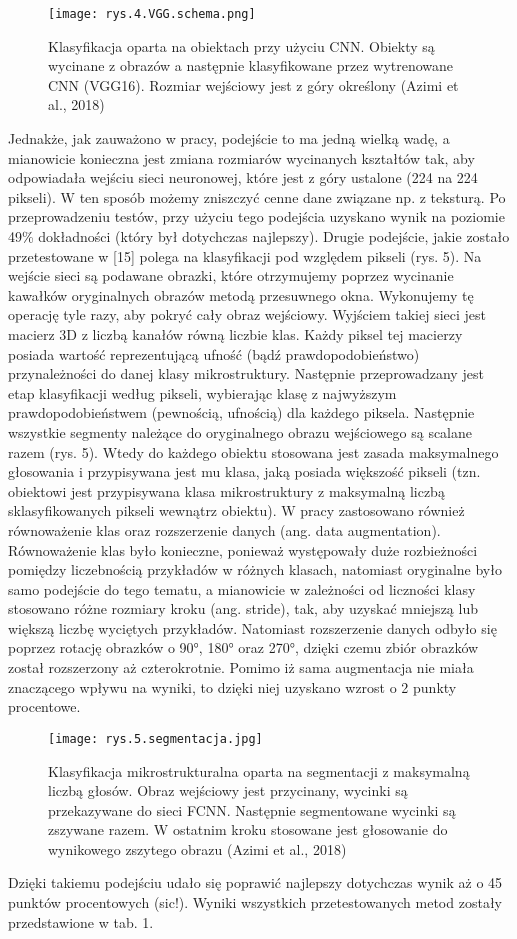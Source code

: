 \begin{figure}[h]
    \centering
    \texttt{[image: rys.4.VGG.schema.png]}
    \caption{Klasyfikacja oparta na obiektach przy użyciu CNN. Obiekty są wycinane z obrazów a następnie klasyfikowane przez wytrenowane CNN (VGG16). Rozmiar wejściowy jest z góry określony (Azimi et al., 2018)}
    \label{fig:mesh4}
\end{figure}

\noindent Jednakże, jak zauważono w pracy, podejście to ma jedną wielką wadę, a mianowicie konieczna jest zmiana rozmiarów wycinanych kształtów tak, aby odpowiadała wejściu sieci neuronowej, które jest z góry ustalone (224 na 224 pikseli). W ten sposób możemy zniszczyć cenne dane związane np. z teksturą. Po przeprowadzeniu testów, przy użyciu tego podejścia uzyskano wynik na poziomie 49\% dokładności (który był dotychczas najlepszy). Drugie podejście, jakie zostało przetestowane w [15] polega na klasyfikacji pod względem pikseli (rys. 5). Na wejście sieci są podawane obrazki, które otrzymujemy poprzez wycinanie kawałków oryginalnych obrazów metodą przesuwnego okna. Wykonujemy tę operację tyle razy, aby pokryć cały obraz wejściowy. Wyjściem takiej sieci jest macierz 3D z liczbą kanałów równą liczbie klas. Każdy piksel tej macierzy posiada wartość reprezentującą ufność (bądź prawdopodobieństwo) przynależności do danej klasy mikrostruktury. Następnie przeprowadzany jest etap klasyfikacji według pikseli, wybierając klasę z najwyższym prawdopodobieństwem (pewnością, ufnością) dla każdego piksela. Następnie wszystkie segmenty należące do oryginalnego obrazu wejściowego są scalane razem (rys. 5). Wtedy do każdego obiektu stosowana jest zasada maksymalnego głosowania i przypisywana jest mu klasa, jaką posiada większość pikseli (tzn. obiektowi jest przypisywana klasa mikrostruktury z maksymalną liczbą sklasyfikowanych pikseli wewnątrz obiektu). W pracy zastosowano również równoważenie klas oraz rozszerzenie danych (ang. data augmentation). Równoważenie klas było konieczne, ponieważ występowały duże rozbieżności pomiędzy liczebnością przykładów w różnych klasach, natomiast oryginalne było samo podejście do tego tematu, a mianowicie w zależności od liczności klasy stosowano różne rozmiary kroku (ang. stride), tak, aby uzyskać mniejszą lub większą liczbę wyciętych przykładów. Natomiast rozszerzenie danych odbyło się poprzez rotację obrazków o 90°, 180° oraz 270°, dzięki czemu zbiór obrazków został rozszerzony aż czterokrotnie. Pomimo iż sama augmentacja nie miała znaczącego wpływu na wyniki, to dzięki niej uzyskano wzrost o 2 punkty procentowe.
\begin{figure}[h]
    \centering
    \texttt{[image: rys.5.segmentacja.jpg]}
    \caption{Klasyfikacja mikrostrukturalna oparta na segmentacji z maksymalną liczbą głosów. Obraz wejściowy jest przycinany, wycinki są przekazywane do sieci FCNN. Następnie 	segmentowane wycinki są zszywane razem. W ostatnim kroku stosowane jest głosowanie do wynikowego zszytego obrazu (Azimi et al., 2018)}
    \label{fig:mesh5}
\end{figure}
Dzięki takiemu podejściu udało się poprawić najlepszy dotychczas wynik aż o 45 punktów procentowych (sic!). Wyniki wszystkich przetestowanych metod zostały przedstawione w tab. 1.

